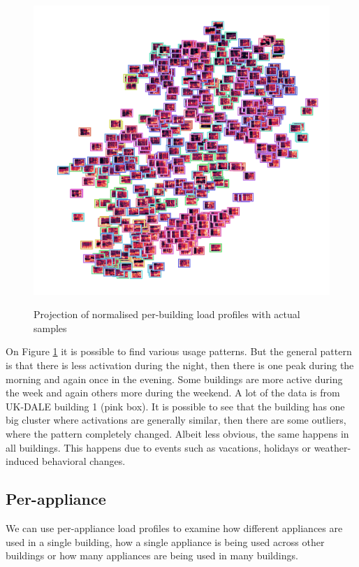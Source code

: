 \begin{figure}[H]
	\centering
	\caption{Projection of normalised per-building load profiles with actual samples}
	\includegraphics[width=.9\textwidth]{Figures/TSNE/TSNE_per_building/all/img_scatter_allall.png}
	\label{fig:tsne_pb_img_norm_scatter_allall}
\end{figure}

On Figure \ref{fig:tsne_pb_img_norm_scatter_allall} it is possible to find various usage patterns. 
But the general pattern is that there is less activation during the night, then there is one peak during the morning and again once in the evening.
Some buildings are more active during the week and again others more during the weekend.
A lot of the data is from UK-DALE building 1 (pink box). 
It is possible to see that the building has one big cluster where activations are generally similar, then there are some outliers,
where the pattern completely changed. 
Albeit less obvious, the same happens in all buildings.
This happens due to events such as vacations, holidays or weather-induced behavioral changes.

\subsection{Per-appliance}

We can use per-appliance load profiles to examine how different appliances 
are used in a single building, how a single appliance is being used across other buildings
or how many appliances are being used in many buildings.

